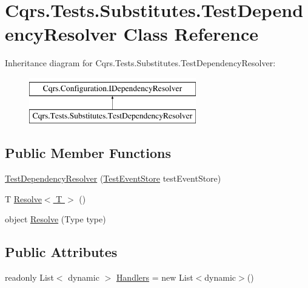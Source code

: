 \hypertarget{classCqrs_1_1Tests_1_1Substitutes_1_1TestDependencyResolver}{}\section{Cqrs.\+Tests.\+Substitutes.\+Test\+Dependency\+Resolver Class Reference}
\label{classCqrs_1_1Tests_1_1Substitutes_1_1TestDependencyResolver}
Inheritance diagram for Cqrs.\+Tests.\+Substitutes.\+Test\+Dependency\+Resolver\+:\begin{figure}[H]
\begin{center}
\leavevmode
\includegraphics[height=2.000000cm]{classCqrs_1_1Tests_1_1Substitutes_1_1TestDependencyResolver}
\end{center}
\end{figure}
\subsection*{Public Member Functions}
\begin{DoxyCompactItemize}
\item 
\hyperlink{classCqrs_1_1Tests_1_1Substitutes_1_1TestDependencyResolver_ab0ecd39381883a73869c061bc60ebff8}{Test\+Dependency\+Resolver} (\hyperlink{classCqrs_1_1Tests_1_1Substitutes_1_1TestEventStore}{Test\+Event\+Store} test\+Event\+Store)
\item 
T \hyperlink{classCqrs_1_1Tests_1_1Substitutes_1_1TestDependencyResolver_a67090a882241fa6a881d49c91c95cad7}{Resolve$<$ T $>$} ()
\item 
object \hyperlink{classCqrs_1_1Tests_1_1Substitutes_1_1TestDependencyResolver_a05767824475ea6affbf6f70cf5b1fd06}{Resolve} (Type type)
\end{DoxyCompactItemize}
\subsection*{Public Attributes}
\begin{DoxyCompactItemize}
\item 
readonly List$<$ dynamic $>$ \hyperlink{classCqrs_1_1Tests_1_1Substitutes_1_1TestDependencyResolver_a6fd9194240dd3d95fec9ba3788ac67e4}{Handlers} = new List$<$dynamic$>$()
\end{DoxyCompactItemize}
